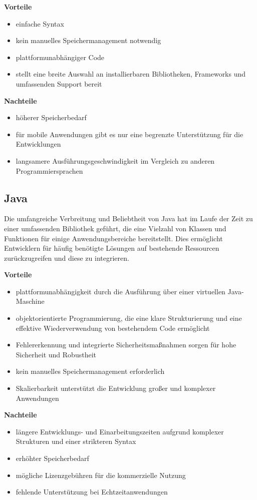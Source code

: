 \textbf{Vorteile}
\begin{itemize}
	\item einfache Syntax
	\item kein manuelles Speichermanagement notwendig
	\item plattformunabhängiger Code
	\item stellt eine breite Auswahl an installierbaren Bibliotheken, Frameworks und umfassenden Support bereit
\end{itemize}

\textbf{Nachteile}
\begin{itemize}
	\item höherer Speicherbedarf
	\item für mobile Anwendungen gibt es nur eine begrenzte Unterstützung für die Entwicklungen
	\item langsamere Ausführungsgeschwindigkeit im Vergleich zu anderen Programmiersprachen
\end{itemize}

\subsection{Java}
Die umfangreiche Verbreitung und Beliebtheit von Java hat im Laufe der Zeit zu einer umfassenden Bibliothek geführt, die eine Vielzahl von Klassen und Funktionen für einige Anwendungsbereiche bereitstellt. Dies ermöglicht Entwicklern für häufig benötigte Lösungen auf bestehende Ressourcen zurückzugreifen und diese zu integrieren. \textcite{Programmiersprachen}

\textbf{Vorteile}
\begin{itemize}
	\item plattformunabhängigkeit durch die Ausführung über einer virtuellen Java-Maschine
	\item objektorientierte Programmierung, die eine klare Strukturierung und eine effektive Wiederverwendung von bestehendem Code ermöglicht
	\item Fehlererkennung und integrierte Sicherheitsmaßnahmen sorgen für hohe Sicherheit und Robustheit
	\item kein manuelles Speichermanagement erforderlich
	\item Skalierbarkeit unterstützt die Entwicklung großer und komplexer Anwendungen
\end{itemize}

\textbf{Nachteile}
\begin{itemize}
	\item längere Entwicklungs- und Einarbeitungszeiten aufgrund komplexer Strukturen und einer strikteren Syntax
	\item erhöhter Speicherbedarf
	\item mögliche Lizenzgebühren für die kommerzielle Nutzung
	\item fehlende Unterstützung bei Echtzeitanwendungen
\end{itemize}

